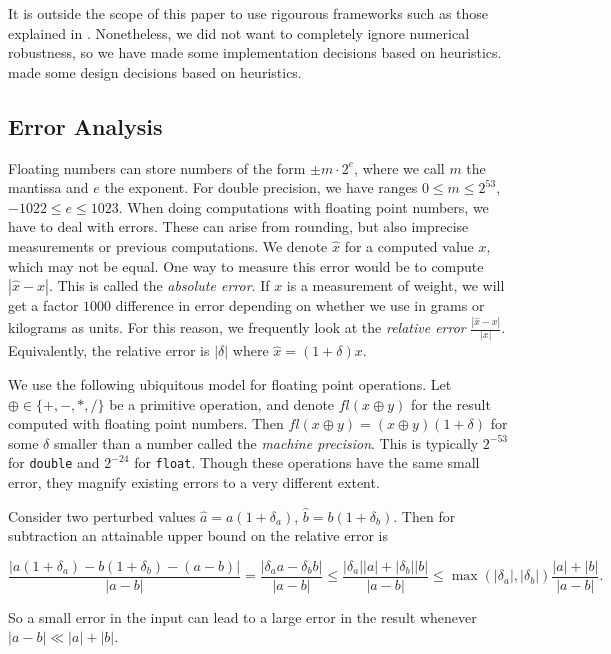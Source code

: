 It is outside the scope of this paper to use rigourous frameworks such as those 
explained in \cite{Higham02, Jiang06}.
Nonetheless, we did not want to completely ignore numerical robustness, so we 
have made some implementation decisions based on heuristics.
made some design decisions based on heuristics.

\subsection{Error Analysis}

Floating numbers can store numbers of the form $\pm m \cdot 2^e$,
where we call $m$ the mantissa and $e$ the exponent. For double precision,
we have ranges $0 \leq m \leq 2^{53}$, $-1022 \leq e \leq 1023$.
When doing computations with floating point numbers, we have to deal with
errors. These can arise from rounding, but also imprecise measurements or
previous computations. We denote $\hat{x}$ for a computed value $x$, which
may not be equal. One way to measure this error would be to compute
$|\hat{x} - x|$. This is called the \textit{absolute error}. If $x$ is a
measurement of weight, we will get a factor $1000$ difference in error
depending on whether we use in grams or kilograms as units. For this reason,
we frequently look at the \textit{relative error} $\frac{|\hat{x} - x|}{|x|}$.
Equivalently, the relative error is $|\delta|$ where $\hat{x} = (1 + \delta)x$.

We use the following ubiquitous model for floating point operations. Let
$\oplus \in \{+, -, *, /\}$ be a primitive operation, and denote 
$fl(x \oplus y)$ for the result computed with floating point numbers. Then
$fl(x \oplus y) = (x \oplus y)(1 + \delta)$ for some $\delta$ smaller than
a number called the \textit{machine precision}. This is typically $2^{-53}$
for \texttt{double} and $2^{-24}$ for \texttt{float}. Though these operations
have the same small error, they magnify existing errors to a very different
extent.

Consider two perturbed values $\hat{a} = a(1 + \delta_a)$,
$\hat{b} = b(1 + \delta_b)$. Then for subtraction an attainable
upper bound on the relative error is

$$\frac{|a(1 + \delta_a) - b(1 + \delta_b) - (a - b)|}{|a - b|} = 
\frac{|\delta_a a - \delta_b b|}{|a - b|} \leq 
\frac{|\delta_a||a| + |\delta_b| |b|}{|a - b|} \leq 
\max(|\delta_a|, |\delta_b|) \frac{|a| + |b|}{|a - b|}.$$

So a small error in the input can lead to a large error in the result whenever 
$|a - b| \ll |a| + |b|$.

